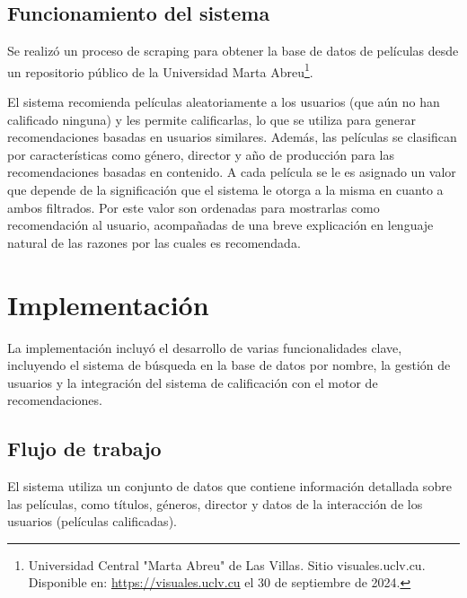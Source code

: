 \documentclass{llncs}
\begin{document}
	

	\subsection{Funcionamiento del sistema}
	Se realizó un proceso de scraping para obtener la base de datos de películas desde un repositorio público de la Universidad Marta Abreu\footnote{Universidad Central "Marta Abreu" de Las Villas. Sitio visuales.uclv.cu. Disponible en: \url{https://visuales.uclv.cu} el 30 de septiembre de 2024.}.
	
	El sistema recomienda películas aleatoriamente a los usuarios (que aún no han calificado ninguna) y les permite calificarlas, lo que se utiliza para generar recomendaciones basadas en usuarios similares. Además, las películas se clasifican por características como género, director y año de producción para las recomendaciones basadas en contenido. 
	A cada película se le es asignado un valor que depende de la significación que el sistema le otorga a la misma en cuanto a ambos filtrados. Por este valor son ordenadas para mostrarlas como recomendación al usuario, acompañadas de una breve explicación en lenguaje natural de las razones por las cuales es recomendada.
	
	
	
	\section{Implementación}
	
	La implementación incluyó el desarrollo de varias funcionalidades clave, incluyendo el sistema de búsqueda en la base de datos por nombre, la gestión de usuarios y la integración del sistema de calificación con el motor de recomendaciones.
	
	
	
	\subsection{Flujo de trabajo}
	El sistema utiliza un conjunto de datos que contiene información detallada sobre las películas, como títulos, géneros, director y datos de la interacción de los usuarios (películas calificadas).
	
\end{document}
